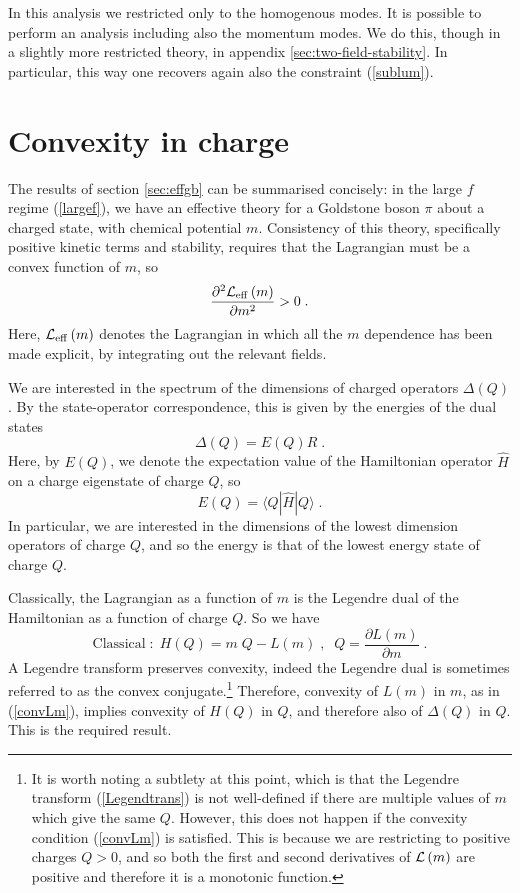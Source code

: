 \documentclass[11pt]{article}
\numberwithin{equation}{section}
\newcommand{\be}{\begin{equation}} \newcommand{\ee}{\end{equation}}
\begin{document}
In this analysis we restricted only to the homogenous modes. It is possible to perform an analysis including also the momentum modes. We do this, though in a slightly more restricted theory, in appendix \ref{sec:two-field-stability}. In particular, this way one recovers again also the constraint (\ref{sublum}).



\section{Convexity in charge}
\label{sec:cco}

The results of section \ref{sec:effgb} can be summarised concisely: in the large $f$ regime (\ref{largef}), we have an effective theory for a Goldstone boson $\pi$ about a charged state, with chemical potential $m$. Consistency of this theory, specifically positive kinetic terms and stability, requires that the Lagrangian must be a convex function of $m$, so
\be
\frac{\partial^2{\cal L}_{\mathrm{eff}}\left(m\right)}{\partial m^2}  > 0 \;.
\label{convLm}
\ee
Here, ${\cal L}_{\mathrm{eff}}\left(m\right)$ denotes the Lagrangian in which all the $m$ dependence has been made explicit, by integrating out the relevant fields. 

We are interested in the spectrum of the dimensions of charged operators $\Delta(Q)$. By the state-operator correspondence, this is given by the energies of the dual states
\be
\Delta\left(Q\right) = E\left(Q\right) R \;.
\ee
Here, by $E(Q)$, we denote the expectation value of the Hamiltonian operator $\hat{H}$ on a charge eigenstate of charge $Q$, so
\be
E(Q) = \langle Q|\hat{H}|Q\rangle \;.
\ee
In particular, we are interested in the dimensions of the lowest dimension operators of charge $Q$, and so the energy is that of the lowest energy state of charge $Q$.

Classically, the Lagrangian as a function of $m$ is the Legendre dual of the Hamiltonian as a function of charge $Q$. So we have
\be
\mathrm{Classical\;:\;} H\left(Q\right) = m \;Q - L(m) \;,\;\; Q = \frac{\partial L\left(m\right)}{\partial m} \;.
   \label{Legendtrans}
\ee
A Legendre transform preserves convexity, indeed the Legendre dual is sometimes referred to as the convex conjugate.\footnote{It is worth noting a subtlety at this point, which is that the Legendre transform (\ref{Legendtrans}) is not well-defined if there are multiple values of $m$ which give the same $Q$. However, this does not happen if the convexity condition (\ref{convLm}) is satisfied. This is because we are restricting to positive charges $Q > 0$, and so both the first and second derivatives of ${\cal L}\left(m\right)$ are positive and therefore it is a monotonic function.} Therefore, convexity of $L(m)$ in $m$, as in (\ref{convLm}), implies convexity of $H(Q)$ in $Q$, and therefore also of $\Delta(Q)$ in $Q$. This is the required result. 
\end{document}
